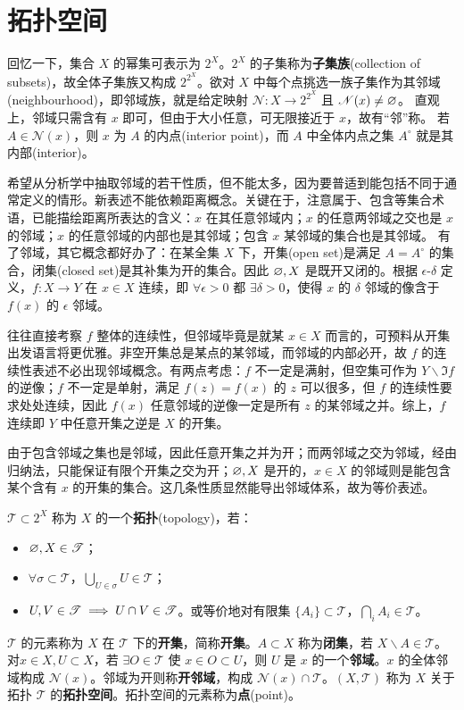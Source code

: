 \section{拓扑空间}

回忆一下，集合 $X$ 的幂集可表示为 $2^X$。$2^X$ 的子集称为\textbf{子集族}(collection of subsets)，故全体子集族又构成 $2^{2^X}$。欲对 $X$ 中每个点挑选⼀族⼦集作为其邻域(neighbourhood)，即邻域族，就是给定映射 $\mathscr N:X\to 2^{2^X}$ 且 $\mathscr N(x)\ne \varnothing$。
直观上，邻域只需含有 $x$ 即可，但由于大小任意，可无限接近于 $x$，故有“邻”称。
若 $A\in \mathscr N(x)$，则 $x$ 为 $A$ 的内点(interior point)，而 $A$ 中全体内点之集 $A^\circ$ 就是其内部(interior)。

希望从分析学中抽取邻域的若干性质，但不能太多，因为要普适到能包括不同于通常定义的情形。新表述不能依赖距离概念。关键在于，注意属于、包含等集合术语，已能描绘距离所表达的含义：$x$ 在其任意邻域内；$x$ 的任意两邻域之交也是 $x$ 的邻域；$x$ 的任意邻域的内部也是其邻域；包含 $x$ 某邻域的集合也是其邻域。
有了邻域，其它概念都好办了：在某全集 $X$ 下，开集(open set)是满足 $A=A^\circ$ 的集合，闭集(closed set)是其补集为开的集合。因此 $\varnothing,X$ 是既开又闭的。根据 $\epsilon$-$\delta$ 定义，$f:X\to Y$ 在 $x\in X$ 连续，即 $\forall\epsilon>0$ 都 $\exists\delta>0$，使得 $x$ 的 $\delta$ 邻域的像含于 $f(x)$ 的 $\epsilon$ 邻域。

往往直接考察 $f$ 整体的连续性，但邻域毕竟是就某 $x\in X$ 而言的，可预料从开集出发语言将更优雅。非空开集总是某点的某邻域，而邻域的内部必开，故 $f$ 的连续性表述不必出现邻域概念。有两点考虑：$f$ 不一定是满射，但空集可作为 $Y\backslash\Im f$ 的逆像；$f$ 不一定是单射，满足 $f(z)=f(x)$ 的 $z$ 可以很多，但 $f$ 的连续性要求处处连续，因此 $f(x)$ 任意邻域的逆像一定是所有 $z$ 的某邻域之并。综上，$f$ 连续即 $Y$ 中任意开集之逆是 $X$ 的开集。

由于包含邻域之集也是邻域，因此任意开集之并为开；而两邻域之交为邻域，经由归纳法，只能保证有限个开集之交为开；$\varnothing,X$ 是开的，$x\in X$ 的邻域则是能包含某个含有 $x$ 的开集的集合。这几条性质显然能导出邻域体系，故为等价表述。

\begin{definition}
$\mathscr{T}\subset 2^X$ 称为 $X$ 的一个\textbf{拓扑}(topology)，若：
\begin{itemize}
    \item $\varnothing,X \in \mathscr{T}$；
    \item $\forall \sigma\subset \mathscr{T}$，$\bigcup_{U\in\sigma} U\in \mathscr{T}$；
    \item $U,V\in\mathscr{T}\implies U\cap V\in\mathscr{T}$。或等价地对有限集 $\{A_{i}\} \subset \mathscr{T}$，$\bigcap_{i} A_{i} \in \mathscr{T}$。
\end{itemize}
$\mathscr{T}$ 的元素称为 $X$ 在 $\mathscr{T}$ 下的\textbf{开集}，简称\textbf{开集}。$A\subset X$ 称为\textbf{闭集}，若 $X\backslash A\in\mathscr{T}$。
对$x\in X,U\subset X$，若 $\exists O\in\mathscr{T}$ 使 $x\in O\subset U$，则 $U$ 是 $x$ 的一个\textbf{邻域}。$x$ 的全体邻域构成 $\mathscr N(x)$。邻域为开则称\textbf{开邻域}，构成 $\mathscr N(x)\cap\mathscr T$。$(X,\mathscr T)$ 称为 $X$ 关于拓扑 $\mathscr T$ 的\textbf{拓扑空间}。拓扑空间的元素称为\textbf{点}(point)。
\end{definition}

